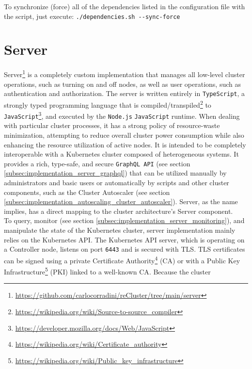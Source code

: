 To synchronize (force) all of the dependencies listed in the configuration file with
the script, just execute: \lstinline[language=shell, alsoletter={.-}, morekeywords={[2]{dependencies.sh}},
morekeywords={[3]{--sync-force}}]{./dependencies.sh --sync-force}

\section{Server}
\label{sec:implementation_server}

Server\footnote{\url{https://github.com/carlocorradini/reCluster/tree/main/server}}
is a completely custom implementation that manages all low-level cluster
operations, such as turning on and off nodes, as well as user operations, such as
authentication and authorization. The server is written entirely in \texttt{TypeScript},
a strongly typed programming language that is compiled/transpiled\footnote{\url{https://wikipedia.org/wiki/Source-to-source_compiler}}
to \texttt{JavaScript}\footnote{\url{https://developer.mozilla.org/docs/Web/JavaScript}}\cite{typescript},
and executed by the \texttt{Node.js} \texttt{JavaScript} runtime\cite{nodejs}. When
dealing with particular cluster processes, it has a strong policy of resource-waste
minimization, attempting to reduce overall cluster power consumption while also enhancing
the resource utilization of active nodes. It is intended to be completely
interoperable with a Kubernetes cluster composed of heterogeneous systems. It provides
a rich, type-safe, and secure \texttt{GraphQL API} (see section \ref{subsec:implementation_server_graphql})
that can be utilized manually by administrators and basic users or automatically
by scripts and other cluster components, such as the Cluster Autoscaler (see
section \ref{subsec:implementation_autoscaling_cluster_autoscaler}). Server, as the
name implies, has a direct mapping to the cluster architecture's Server
component. \\ %
To query, monitor (see section \ref{subsec:implementation_server_monitoring}),
and manipulate the state of the Kubernetes cluster, server implementation mainly
relies on the Kubernetes API. The Kubernetes API server, which is operating on a
Controller node, listens on port \texttt{6443} and is secured with TLS. TLS
certificates can be signed using a private Certificate Authority\footnote{\url{https://wikipedia.org/wiki/Certificate_authority}}
(CA) or with a Public Key Infrastructure\footnote{\url{https://wikipedia.org/wiki/Public_key_infrastructure}}
(PKI) linked to a well-known CA\cite{k8s_api_access}. Because the cluster

